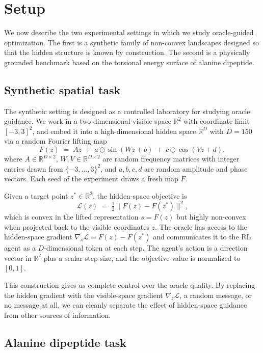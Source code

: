 \documentclass[10pt]{article}
\theoremstyle{definition}
\newcommand{\R}{\mathbb{R}}
\begin{document}
\section{Setup}

We now describe the two experimental settings in which we study oracle-guided optimization. The first is a synthetic family of non-convex landscapes designed so that the hidden structure is known by construction. The second is a physically grounded benchmark based on the torsional energy surface of alanine dipeptide.

\subsection{Synthetic spatial task}

The synthetic setting is designed as a controlled laboratory for studying oracle guidance. We work in a two-dimensional visible space $\R^2$ with coordinate limit $[-3, 3]^2$, and embed it into a high-dimensional hidden space $\R^D$ with $D = 150$ via a random Fourier lifting map
\[
    F(z) \;=\; A z \;+\; a \odot \sin(W z + b) \;+\; c \odot \cos(V z + d),
\]
where $A \in \R^{D \times 2}$, $W, V \in \R^{D \times 2}$ are random frequency matrices with integer entries drawn from $\{-3, \ldots, 3\}^2$, and $a, b, c, d$ are random amplitude and phase vectors. Each seed of the experiment draws a fresh map $F$.

Given a target point $z^* \in \R^2$, the hidden-space objective is
\[
    \mathcal{L}(z) \;=\; \tfrac{1}{2}\|F(z) - F(z^*)\|^2,
\]
which is convex in the lifted representation $s = F(z)$ but highly non-convex when projected back to the visible coordinates $z$. The oracle has access to the hidden-space gradient $\nabla_s \mathcal{L} = F(z) - F(z^*)$ and communicates it to the RL agent as a $D$-dimensional token at each step. The agent's action is a direction vector in $\R^2$ plus a scalar step size, and the objective value is normalized to $[0, 1]$.

This construction gives us complete control over the oracle quality. By replacing the hidden gradient with the visible-space gradient $\nabla_z \mathcal{L}$, a random message, or no message at all, we can cleanly separate the effect of hidden-space guidance from other sources of information.

\subsection{Alanine dipeptide task}
\end{document}
